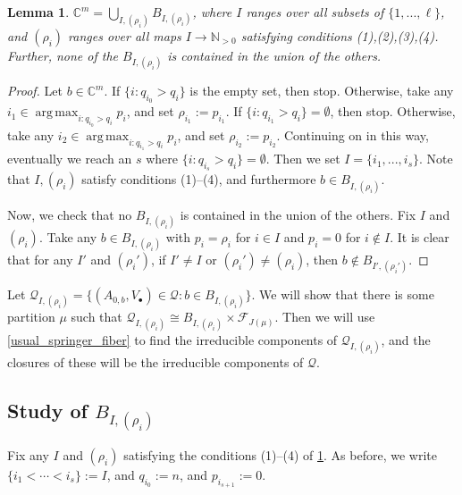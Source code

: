 \documentclass[12pt,psamsfonts]{article}
\DeclareMathOperator*{\argmax}{arg\,max}
\newtheorem{lemma}[theorem]{Lemma}
\begin{document}
\begin{lemma}\label{bs_union}
    \(\mathbb{C}^m = \bigcup_{I, (\rho_i)} B_{I, (\rho_i)}\), where \(I\) ranges over all subsets of \(\{1, ..., \ell\}\), and \((\rho_i)\) ranges over all maps \(I \to \mathbb{N}_{>0}\) satisfying conditions (1),(2),(3),(4).
    Further, none of the \(B_{I, (\rho_i)}\) is contained in the union of the others.
\end{lemma}
\begin{proof}
    Let \(b \in \mathbb{C}^m\).
    If \(\{i : q_{i_0} > q_i\}\) is the empty set, then stop.
    Otherwise, take any \(i_1 \in \argmax_{i : q_{i_0} > q_i} p_i\), and set \(\rho_{i_1} := p_{i_1}\).
    If \(\{i : q_{i_1} > q_i\} = \emptyset\), then stop.
    Otherwise, take any \(i_2 \in \argmax_{i : q_{i_1} > q_i} p_i\), and set \(\rho_{i_2} := p_{i_2}\).
    Continuing on in this way, eventually we reach an \(s\) where \(\{i : q_{i_s} > q_i\} = \emptyset\).
    Then we set \(I = \{i_1, ..., i_s\}\).
    Note that \(I, (\rho_i)\) satisfy conditions (1)--(4), and furthermore \(b \in B_{I, (\rho_i)}\).
    \par Now, we check that no \(B_{I, (\rho_i)}\) is contained in the union of the others.
    Fix \(I\) and \((\rho_i)\).
    Take any \(b \in B_{I, (\rho_i)}\) with \(p_i = \rho_i\) for \(i \in I\) and \(p_i = 0\) for \(i \notin I\).
    It is clear that for any \(I'\) and \((\rho_i')\), if \(I' \neq I\) or \((\rho_i') \neq (\rho_i)\), then \(b \notin B_{I', (\rho_i')}\).
\end{proof}
\par Let \(\mathcal{Q}_{I, (\rho_i)} = \{(A_{0, b}, V_\bullet) \in \mathcal{Q} : b \in B_{I, (\rho_i)}\}\).
We will show that there is some partition \(\mu\) such that \(\mathcal{Q}_{I, (\rho_i)} \cong B_{I, (\rho_i)} \times \mathcal{F}_{J(\mu)}\).
Then we will use \cref{usual_springer_fiber} to find the irreducible components of \(\mathcal{Q}_{I, (\rho_i)}\), and the closures of these will be the irreducible components of \(\mathcal{Q}\).

\subsection{Study of \texorpdfstring{\(B_{I, (\rho_i)}\)}{B\_\{I, (p\_i)\}}}
Fix any \(I\) and \((\rho_i)\) satisfying the conditions (1)--(4) of \cref{bs_union}.
As before, we write \(\{i_1 < \cdots < i_s\} := I\), and \(q_{i_0} := n\), and \(p_{i_{s + 1}} := 0\).
\end{document}

